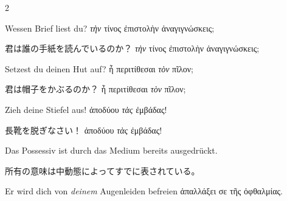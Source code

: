 \begin{paracol}{2}
\begin{enumerate}[leftmargin=0pt,rightmargin=0pt,listparindent =1cm,labelindent=1cm,labelsep=1ex,labelwidth={*},itemindent={*},align=left]
\begin{german}
\begin{continuousitemline}Wessen Brief liest du? \textgreek[variant=ancient]{\emph{τὴν}
τίνος ἐπιστολὴν ἀναγιγνώσκεις;}\par\end{continuousitemline}
\end{german}
\switchcolumn

\begin{japanese}
君は誰の手紙を読んでいるのか？
\textgreek[variant=ancient]{\emph{τὴν} τίνος ἐπιστολὴν ἀναγιγνώσκεις;}
\end{japanese}
\switchcolumn*

\begin{german}
\item Setzest du deinen Hut auf? \textgreek[variant=ancient]{ἦ περιτίθεσαι
\emph{τὸν} πῖλον;}
\end{german}
\switchcolumn

\begin{japanese}
君は帽子をかぶるのか？ \textgreek[variant=ancient]{ἦ περιτίθεσαι
\emph{τὸν} πῖλον;}
\end{japanese}
\switchcolumn*

\begin{german}
\begin{continuousitemline}Zieh deine Stiefel aus! \textgreek[variant=ancient]{ἀποδύου
\emph{τὰς} ἐμβάδας!}\par\end{continuousitemline}
\end{german}
\switchcolumn

\begin{japanese}
長靴を脱ぎなさい！ \textgreek[variant=ancient]{ἀποδύου
\emph{τὰς} ἐμβάδας!}
\end{japanese}
\switchcolumn*

\begin{german}
Das Possessiv ist durch das Medium bereits ausgedrückt. 
\end{german}
\switchcolumn

\begin{japanese}
所有の意味は中動態によってすでに表されている。
\end{japanese}
\switchcolumn*

\begin{german}
\item Er wird dich von \emph{deinem} Augenleiden befreien \textgreek[variant=ancient]{ἀπαλλάξει
σε τῆς ὀφθαλμίας.}
\end{german}
\switchcolumn


\end{enumerate}
\end{paracol}
